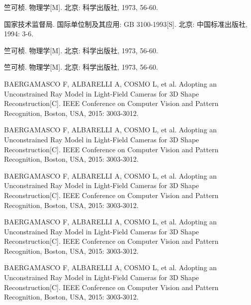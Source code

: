 \begin{thebibliography}{200}
竺可桢. 物理学[M]. 北京: 科学出版社, 1973, 56-60.

国家技术监督局. 国际单位制及其应用: GB 3100-1993[S]. 北京: 中国标准出版社, 1994: 3-6.

竺可桢. 物理学[M]. 北京: 科学出版社, 1973, 56-60.

竺可桢. 物理学[M]. 北京: 科学出版社, 1973, 56-60.

BAERGAMASCO F, ALBARELLI A, COSMO L, et al. Adopting an Unconstrained Ray Model in Light-Field Cameras for 3D Shape Reconstruction[C]. IEEE Conference on Computer Vision and Pattern Recognition, Boston, USA, 2015: 3003-3012.

BAERGAMASCO F, ALBARELLI A, COSMO L, et al. Adopting an Unconstrained Ray Model in Light-Field Cameras for 3D Shape Reconstruction[C]. IEEE Conference on Computer Vision and Pattern Recognition, Boston, USA, 2015: 3003-3012.

BAERGAMASCO F, ALBARELLI A, COSMO L, et al. Adopting an Unconstrained Ray Model in Light-Field Cameras for 3D Shape Reconstruction[C]. IEEE Conference on Computer Vision and Pattern Recognition, Boston, USA, 2015: 3003-3012.

BAERGAMASCO F, ALBARELLI A, COSMO L, et al. Adopting an Unconstrained Ray Model in Light-Field Cameras for 3D Shape Reconstruction[C]. IEEE Conference on Computer Vision and Pattern Recognition, Boston, USA, 2015: 3003-3012.

BAERGAMASCO F, ALBARELLI A, COSMO L, et al. Adopting an Unconstrained Ray Model in Light-Field Cameras for 3D Shape Reconstruction[C]. IEEE Conference on Computer Vision and Pattern Recognition, Boston, USA, 2015: 3003-3012.


\end{thebibliography}

%
%





\clearpage